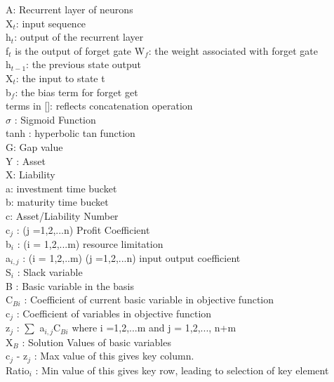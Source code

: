 
A: Recurrent layer of neurons\\
X$_{t}$: input sequence\\
h$_{t}$: output of the recurrent layer\\
f$_{t}$ is the output of forget gate
W$_{f}$: the weight associated with forget gate\\
h$_{t-1}$: the previous state output\\
X$_{t}$: the input to state t\\
b$_{f}$: the bias term for forget get\\
terms in []: reflects concatenation operation\\
$\sigma$ : Sigmoid Function\\
tanh : hyperbolic tan function\\

G: Gap value\\
Y : Asset\\
X: Liability\\
a: investment time bucket\\
b: maturity time bucket\\
c: Asset/Liability Number\\
c$_{j}$ : (j =1,2,...n) Profit Coefficient \\
b$_{i}$ : (i = 1,2,...m) resource limitation \\
a$_{i,j}$ : (i = 1,2,..m) (j =1,2,...n) input output coefficient \\ 
S$_{i}$ : Slack variable \\ 
B : Basic variable in the basis \\ 
C$_{Bi}$ : Coefficient of current basic variable in objective function \\ 
c$_{j}$ : Coefficient of variables in objective function \\ 
z$_{j}$ : $\sum$ a$_{i,j}$C$_{Bi}$ where i =1,2,...m and j = 1,2,..., n+m \\ 
X$_{B}$ :  Solution Values of basic variables \\ 
c$_{j}$ - z$_{j}$ : Max value of this gives key column. \\ 
Ratio$_{i}$ : Min value of this gives key row, leading to selection of key element \\ 


